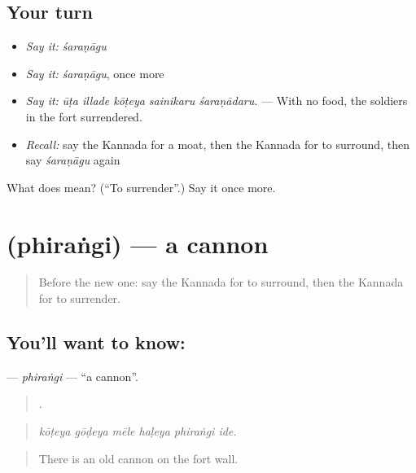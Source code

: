 \subsection*{Your turn}
\begin{itemize}
\raggedright
  \item \emph{Say it:} \emph{śaraṇāgu}
  \item \emph{Say it:} \emph{śaraṇāgu}, once more
  \item \emph{Say it:} \emph{ūṭa illade kōṭeya sainikaru śaraṇādaru.} — With no food, the soldiers in the fort surrendered.
  \item \emph{Recall:} say the Kannada for a moat, then the Kannada for to surround, then say \emph{śaraṇāgu} again
\end{itemize}

\begin{tcolorbox}[breakable,colback=teal!4,colframe=teal!35!black,title={Before you move on}]
What does  mean? (\textquotedblleft{}To surrender\textquotedblright{}.) Say it once more.
\end{tcolorbox}
\section[\texorpdfstring{\kn{ಫಿರಂಗಿ} (phiraṅgi)}{ಫಿರಂಗಿ (phiraṅgi)}]{ (phiraṅgi) — a cannon}

\label{lesson:KA-C342-phirangi}



\begin{quote}
Before the new one: say the Kannada for to surround, then the Kannada for to surrender.
\end{quote}

\subsection*{You'll want to know: }
\textbf{} — \emph{phiraṅgi} — \textquotedblleft{}a cannon\textquotedblright{}.

\begin{quote}
     .
\end{quote}

\begin{quote}
\emph{kōṭeya gōḍeya mēle haḷeya phiraṅgi ide.}
\end{quote}

\begin{quote}
There is an old cannon on the fort wall.
\end{quote}

